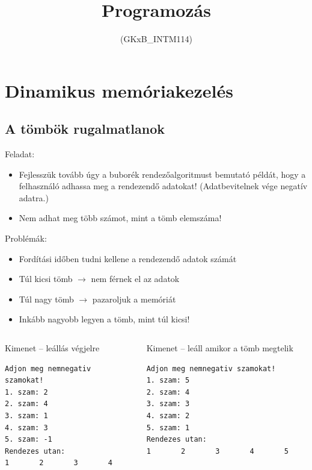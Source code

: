 \documentclass[usenames,dvipsnames,aspectratio=169]{beamer}
\title[8. előadás]{Programozás}
\subtitle{(GKxB\_INTM114)}
\begin{document}
\begin{frame}[plain]
  \titlepage
  \logoalul
\end{frame}

\section{Dinamikus memóriakezelés}
\subsection{A tömbök rugalmatlanok}
\begin{frame}
  Feladat:
  \begin{itemize}
    \item Fejlesszük tovább úgy a buborék rendezőalgoritmust bemutató példát, hogy a felhasználó adhassa meg a rendezendő adatokat! (Adatbevitelnek vége negatív adatra.)
    \item Nem adhat meg több számot, mint a tömb elemszáma!
  \end{itemize}
  \vfill
  Problémák:
  \begin{itemize}
    \item Fordítási időben tudni kellene a rendezendő adatok számát
    \item Túl kicsi tömb $\to$ nem férnek el az adatok
    \item Túl nagy tömb $\to$ pazaroljuk a memóriát
    \item Inkább nagyobb legyen a tömb, mint túl kicsi!
  \end{itemize}
\end{frame}

\begin{frame}[fragile]
  \begin{columns}[T]
      \begin{block}{Kimenet -- leállás végjelre}
        \begin{verbatim}
Adjon meg nemnegativ szamokat!
1. szam: 2
2. szam: 4
3. szam: 1
4. szam: 3
5. szam: -1
Rendezes utan:
1       2       3       4       
        \end{verbatim}
      \end{block}
      \begin{block}{Kimenet -- leáll amikor a tömb megtelik}
        \begin{verbatim}
Adjon meg nemnegativ szamokat!
1. szam: 5
2. szam: 4
3. szam: 3
4. szam: 2
5. szam: 1
Rendezes utan:
1       2       3       4       5       
        \end{verbatim}
      \end{block}
  \end{columns}
\end{frame}
\end{document}
